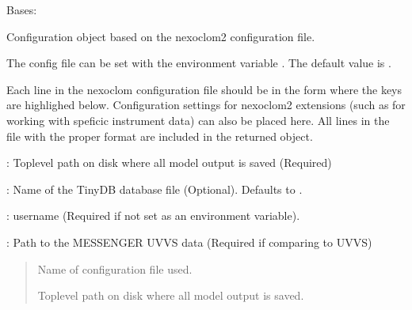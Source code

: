\documentclass[letterpaper,10pt,english]{sphinxmanual}
\begin{document}
\begin{fulllineitems}
\label{\detokenize{apidocs/nexoclom2.utilities:nexoclom2.utilities.NexoclomConfig.NexoclomConfig}}
\pysigstartsignatures
\pysigline
{}
\pysigstopsignatures
\sphinxAtStartPar
Bases: 

\sphinxAtStartPar
Configuration object based on the nexoclom2 configuration file.

\sphinxAtStartPar
The config file can be set with the environment variable .
The default value is .

\sphinxAtStartPar
Each line in the nexoclom configuration file should be in the form
 where the keys are highlighed below. Configuration
settings for nexoclom2 extensions (such as for working with speficic
instrument data) can also be placed here. All lines in the file with the
proper format are included in the returned object.

\sphinxAtStartPar
{}: Top\sphinxhyphen{}level path on disk where all model output is saved (Required)

\sphinxAtStartPar
{}: Name of the TinyDB database file (Optional). Defaults to
.

\sphinxAtStartPar
{}: username (Required if not set as an environment variable).

\sphinxAtStartPar
{}: Path to the MESSENGER UVVS data (Required if comparing to UVVS)
\begin{quote}\begin{description}
\begin{description}
\end{description}

\begin{description}
\sphinxAtStartPar
Name of configuration file used.

\sphinxAtStartPar
Top\sphinxhyphen{}level path on disk where all model output is saved.


\end{description}
\end{description}
\end{quote}
\end{fulllineitems}
\end{document}
